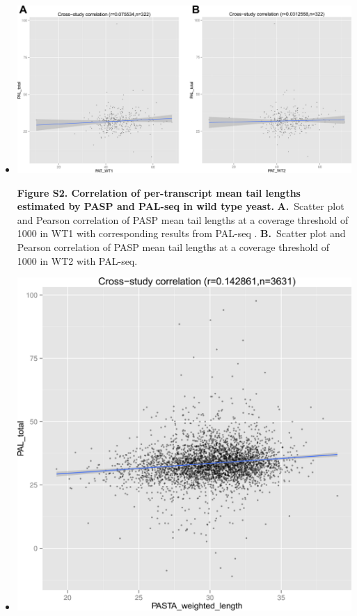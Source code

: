 \documentclass[10pt]{article}
\begin{document}
\begin{itemize}
\item[]{
\begin{center}
\includegraphics[scale=0.9]{FigureS2.png}
\end{center}

\textbf{Figure S2. Correlation of per-transcript mean tail lengths estimated by PASP and PAL-seq in wild type yeast.} \textbf{A.}~Scatter plot and Pearson correlation of PASP mean tail lengths at a coverage threshold of 1000 in WT1 with corresponding results from PAL-seq \cite{subtelny14}. \textbf{B.}~Scatter plot and Pearson correlation of PASP mean tail lengths at a coverage threshold of 1000 in WT2 with PAL-seq.}
\newpage

\item[]{
\begin{center}
\includegraphics[scale=1.25]{FigureS3.png}
\end{center}

}
\end{itemize}
\end{document}

